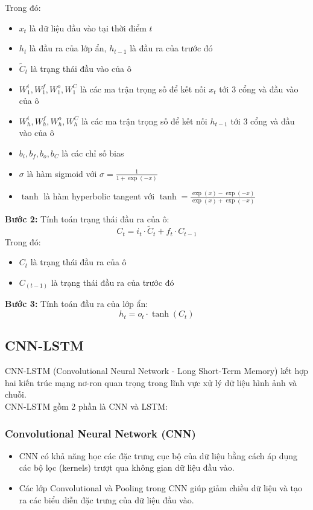 \documentclass[conference]{IEEEtran}
\begin{document}
Trong đó: 
\begin{itemize}
    \item $x_t$ là dữ liệu đầu vào tại thời điểm $t$
    \item $h_t$ là đầu ra của lớp ẩn, $h_{t-1}$ là đầu ra của trước đó
    \item $\tilde{C}_t$ là trạng thái đầu vào của ô
    \item $W_1^i, W_1^f, W_1^o, W_1^C$ là các ma trận trọng số để kết nối $x_t$ tới 3 cổng và đầu vào của ô
    \item $W_h^i, W_h^f, W_h^o, W_h^C$ là các ma trận trọng số để kết nối $h_{t-1}$ tới 3 cổng và đầu vào của ô
    \item $b_i, b_f, b_o, b_C$ là các chỉ số bias
    \item $\sigma$ là hàm sigmoid với $\sigma = \frac{1}{1 + \exp(-x)}$
    \item $\tanh$ là hàm hyperbolic tangent với $\tanh = \frac{\exp(x) - \exp(-x)}{\exp(x) + \exp(-x)}$
\end{itemize}
\textbf{Bước 2:} Tính toán trạng thái đầu ra của ô:
\[C_t = i_t \cdot \tilde{C}_t + f_t \cdot C_{t-1}\]
Trong đó: 
\begin{itemize}
    \item $C_t$ là trạng thái đầu ra của ô
    \item $C_(t-1)$ là trạng thái đầu ra của trước đó
\end{itemize}
\textbf{Bước 3:} Tính toán đầu ra của lớp ẩn:
\[h_t = o_t \cdot \tanh(C_t)\]

\subsection{CNN-LSTM}
CNN-LSTM (Convolutional Neural Network - Long Short-Term Memory) kết hợp hai kiến trúc mạng nơ-ron quan trọng trong lĩnh vực xử lý dữ liệu hình ảnh và chuỗi. \cite{PredictStockCNNLSTM}\\
CNN-LSTM gồm 2 phần là CNN và LSTM:
\subsubsection{Convolutional Neural Network (CNN)}
\begin{itemize}
    \item CNN có khả năng học các đặc trưng cục bộ của dữ liệu bằng cách áp dụng các bộ lọc (kernels) trượt qua không gian dữ liệu đầu vào.
    \item Các lớp Convolutional và Pooling trong CNN giúp giảm chiều dữ liệu và tạo ra các biểu diễn đặc trưng của dữ liệu đầu vào.
\end{itemize}
\end{document}
